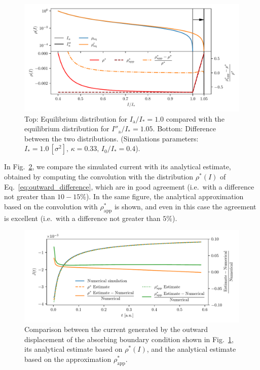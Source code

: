 \begin{figure}[htp]
    \centering
    \includegraphics[width=\textwidth]{4_probing_the_diffusive_behavior/figs/final/difference_outwards_s.pdf}
    \caption{Top: Equilibrium distribution for $I_\mathrm{a}/I_\ast = 1.0$ compared with the equilibrium distribution for $I''_\mathrm{a}/I_\ast = 1.05$. Bottom: Difference between the two distributions. (Simulations parameters: $I_\ast = 1.0\,[\sigma^2],\, \kappa = 0.33,\, I_0/I_\ast = 0.4$).}
    \label{fig:6}
\end{figure}

In Fig.~\ref{fig:7}, we compare the simulated current with its analytical estimate, obtained by computing the convolution with the distribution $\rho^\ast(I)$ of Eq.~\eqref{eq:outward_difference}, which are in good agreement {(i.e.\ with a difference not greater than $10-15\%$)}. In the same figure, the analytical approximation based on the convolution with $\rho^\ast_\text{app}$ is shown, and even in this case the agreement is excellent {(i.e.\ with a difference not greater than $5\%$)}.

\begin{figure}[htp]
    \centering
    \includegraphics[width=\textwidth]{4_probing_the_diffusive_behavior/figs/final/current_outwards.pdf}
    \caption{Comparison between the current generated by the outward displacement of the absorbing boundary condition shown in Fig.~\ref{fig:6}, its analytical estimate based on $\rho^\ast(I)$, and the analytical estimate based on the approximation $\rho^\ast_\text{app}$.}
    \label{fig:7}
\end{figure}

